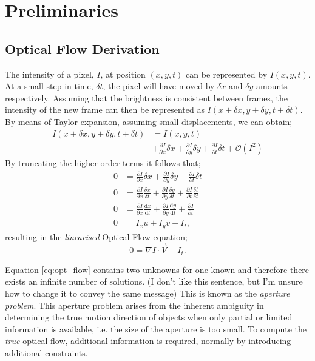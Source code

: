 \section{Preliminaries}\label{section:prelim}

\subsection{Optical Flow Derivation}

\IEEEPARstart{}{}The intensity of a pixel, $I$, at position $(x, y, t)$ can be represented by $I(x, y, t)$. At a small step in time, $\delta t$, the pixel will have moved by $\delta x$ and $\delta y$ amounts respectively. Assuming that the brightness is consistent between frames, the intensity of the new frame can then be represented as $I(x+\delta x, y + \delta y, t + \delta t)$. By means of Taylor expansion, assuming small displacements, we can obtain;
\begin{align*}
	I(x+\delta x, y + \delta y, t + \delta t) &= I(x, y, t) \\ &+ \frac{\partial I}{\partial x} \delta x + \frac{\partial I}{\partial y} \delta y + \frac{\partial I}{\partial t} \delta t + \mathcal{O}(I^2 )
\end{align*}
By truncating the higher order terms it follows that;
\begin{align*}
	0 &= \frac{\partial I}{\partial x} \delta x + \frac{\partial I}{\partial y} \delta y + \frac{\partial I}{\partial t} \delta t  \\
	0 &= \frac{\partial I}{\partial x} \frac{\delta x}{\delta t} + \frac{\partial I}{\partial y} \frac{\delta y}{\delta t} + \frac{\partial I}{\partial t} \frac{\delta t}{\delta t} \\
	0 &= \frac{\partial I}{\partial x} \frac{\mathrm{d}x}{\mathrm{d} t} + \frac{\partial I}{\partial y} \frac{\mathrm{d} y}{\mathrm{d} t} + \frac{\partial I}{\partial t} \\
	0 &= I_x u + I_y v + I_t,
\end{align*}
resulting in the \textit{linearised} Optical Flow equation;
\begin{equation} \label{eq:opt_flow}
	0 = \nabla I \cdot \vec{V} + I_t. 
\end{equation}

\IEEEPARstart{}{} Equation \ref{eq:opt_flow} contains two unknowns for one known and therefore there exists an infinite number of solutions. \color{red}(I don't like this sentence, but I'm unsure how to change it to convey the same message) \color{black} This is known as the \textit{aperture problem}. This aperture problem arises from the inherent ambiguity in determining the true motion direction of objects when only partial or limited information is available, i.e. the size of the aperture is too small. To compute the \textit{true} optical flow, additional information is required, normally by introducing additional constraints.

